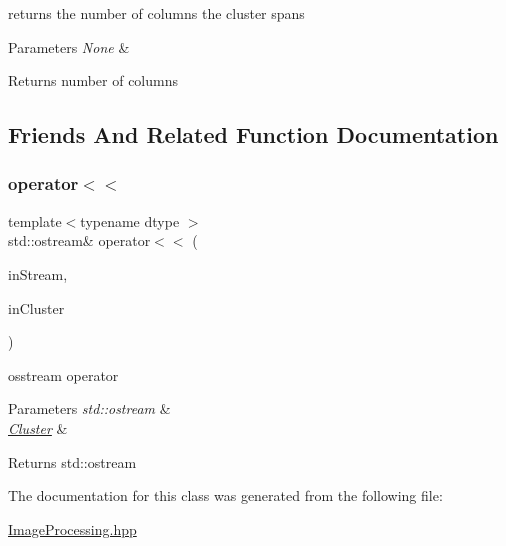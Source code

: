 returns the number of columns the cluster spans


\begin{DoxyParams}{Parameters}
{\em None} & \\
\hline
\end{DoxyParams}
\begin{DoxyReturn}{Returns}
number of columns 
\end{DoxyReturn}


\subsection{Friends And Related Function Documentation}
\mbox{\label{class_num_c_1_1_image_processing_1_1_cluster_a9b2341014fa476e2540940941d9dcb30}} 
\subsubsection{\texorpdfstring{operator$<$$<$}{operator<<}}
{\footnotesize\ttfamily template$<$typename dtype $>$ \\
std\+::ostream\& operator$<$$<$ (\begin{DoxyParamCaption}\item[{std\+::ostream \&}]{in\+Stream,  }\item[{const \mbox{\hyperlink{class_num_c_1_1_image_processing_1_1_cluster}{Cluster}} \&}]{in\+Cluster }\end{DoxyParamCaption})\hspace{0.3cm}{\ttfamily [friend]}}

osstream operator


\begin{DoxyParams}{Parameters}
{\em std\+::ostream} & \\
\hline
{\em \mbox{\hyperlink{class_num_c_1_1_image_processing_1_1_cluster}{Cluster}}} & \\
\hline
\end{DoxyParams}
\begin{DoxyReturn}{Returns}
std\+::ostream 
\end{DoxyReturn}


The documentation for this class was generated from the following file\+:\begin{DoxyCompactItemize}
\item 
\mbox{\hyperlink{_image_processing_8hpp}{Image\+Processing.\+hpp}}\end{DoxyCompactItemize}
